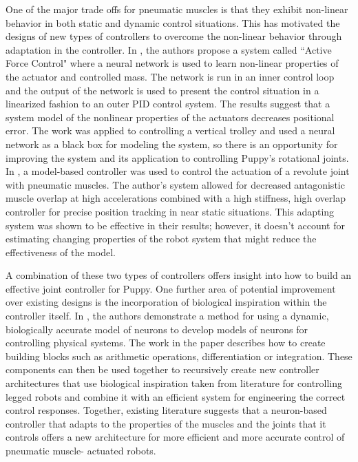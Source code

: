 \documentclass[letterpaper, 10 pt, conference]{IEEEconf} %
\begin{document}
One of the major trade offs for pneumatic muscles is that they exhibit 
non-linear behavior in both static and dynamic control situations.
\cite{HuntPMuscles, DynamicPMuscles} This has 
motivated the designs of new types of controllers to overcome the non-linear
behavior through adaptation in the controller. In \cite{Jahanabadi2009}, the
authors propose a system called ``Active Force Control" where a neural network
is used to learn non-linear properties of the actuator and controlled mass.
The network is run in an inner control loop and the output of the network is
used to present the control situation in a linearized fashion to an outer PID
control system. The results suggest that a system model of the nonlinear 
properties of the actuators decreases positional error. The work was
applied to controlling a vertical trolley and used a neural network as a black
box for modeling the system, so there is an opportunity for improving the 
system and its application to controlling Puppy's rotational joints. 
In \cite{Wang2013}, a model-based controller was used to control the actuation
of a revolute joint with pneumatic muscles. The author's system allowed for
decreased antagonistic muscle overlap at high accelerations combined with a 
high stiffness, high overlap controller for precise position tracking in near
static situations. This adapting system was shown to be effective in their
results; however, it doesn't account for estimating changing properties of the
robot system that might reduce the effectiveness of the model.

A combination of these two types of controllers offers insight into how to build
an effective joint controller for Puppy. One further area of potential 
improvement over existing designs is the incorporation of biological inspiration
within the controller itself. In \cite{NickFunctionalSubnetwork}, the authors
demonstrate a method for using a dynamic, biologically accurate model of neurons
to develop models of neurons for controlling physical systems. The work in the 
paper describes how to create building blocks such as arithmetic operations,
differentiation or integration. These components can then be used together to 
recursively create new controller architectures that use biological inspiration
taken from literature for controlling legged robots and combine it with an
efficient system for engineering the correct control responses. Together,
existing literature suggests that a neuron-based controller that adapts to the
properties of the muscles and the joints that it controls offers a new
architecture for more efficient and more accurate control of pneumatic muscle-
actuated robots.
\end{document}
